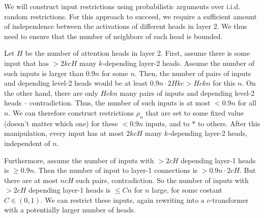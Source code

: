 \documentclass[11pt,a4paper]{article}
\begin{document}

We will construct input restrictions using probabilistic arguments over i.i.d. random restrictions.
For this approach to succeed, we require a  sufficient amount of independence between the activations of different heads in layer 2.
We thus need to ensure that the number of neighbors of each head is bounded.

Let $H$ be the number of attention heads in layer 2.
First, assume there is some input that has $>2kcH$ many $k$-depending layer-2 heads.
Assume the number of such inputs is larger than $0.9n$ for some $n$.
Then, the number of pairs of inputs and depending level-2 heads would be at least $0.9 n \cdot 2 H k c > Hckn$ for this $n$.
On the other hand, there are only $Hckn$ many pairs of inputs and depending level-2 heads -- contradiction.
Thus, the number of such inputs is at most $<0.9n$ for all $n$.
We can therefore construct restrictions $\rho_n$ that are set to some fixed value (doesn't matter which one) for these $<0.9n$ inputs, and to $*$ to others.
After this manipulation, every input has at most $2kcH$ many $k$-depending layer-2 heads, independent of $n$. %


Furthermore, assume the number of inputs with $> 2cH$ depending layer-1 heads is $\geq 0.9n$.
Then the number of input to layer-1 connections is $>0.9n \cdot 2cH$.
But there are at most $ncH$ such pairs, contradiction.
So the number of inputs with $> 2cH$ depending layer-1 heads is $\leq Cn$ for $n$ large, for some costant $C \in (0,1)$.
We can restrict these inputs, again rewriting into a $c$-transformer with a potentially larger number of heads.



\end{document}
